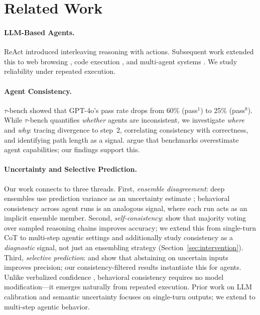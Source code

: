 \documentclass{article}
\begin{document}
\section{Related Work}

\paragraph{LLM-Based Agents.}
ReAct \citep{yao2022react} introduced interleaving reasoning with actions. Subsequent work extended this to web browsing \citep{zhou2023webarena}, code execution \citep{yang2024swe}, and multi-agent systems \citep{wu2023autogen}. We study reliability under repeated execution.

\paragraph{Agent Consistency.}
$\tau$-bench \citep{yao2024tau} showed that GPT-4o's pass rate drops from 60\% (pass$^1$) to 25\% (pass$^8$). While $\tau$-bench quantifies \emph{whether} agents are inconsistent, we investigate \emph{where} and \emph{why}: tracing divergence to step~2, correlating consistency with correctness, and identifying path length as a signal. \citet{stroebl2024agents} argue that benchmarks overestimate agent capabilities; our findings support this.

\paragraph{Uncertainty and Selective Prediction.}
Our work connects to three threads. First, \emph{ensemble disagreement}: deep ensembles use prediction variance as an uncertainty estimate \citep{lakshminarayanan2017simple}; behavioral consistency across agent runs is an analogous signal, where each run acts as an implicit ensemble member. Second, \emph{self-consistency}: \citet{wang2022self} show that majority voting over sampled reasoning chains improves accuracy; we extend this from single-turn CoT to multi-step agentic settings and additionally study consistency as a \emph{diagnostic} signal, not just an ensembling strategy (Section~\ref{sec:intervention}). Third, \emph{selective prediction}: \citet{geifman2017selective} and \citet{kamath2020selective} show that abstaining on uncertain inputs improves precision; our consistency-filtered results instantiate this for agents. Unlike verbalized confidence \citep{xiong2024llms, tian2023just}, behavioral consistency requires no model modification---it emerges naturally from repeated execution. Prior work on LLM calibration \citep{kadavath2022language} and semantic uncertainty \citep{kuhn2023semantic} focuses on single-turn outputs; we extend to multi-step agentic behavior.
\end{document}
